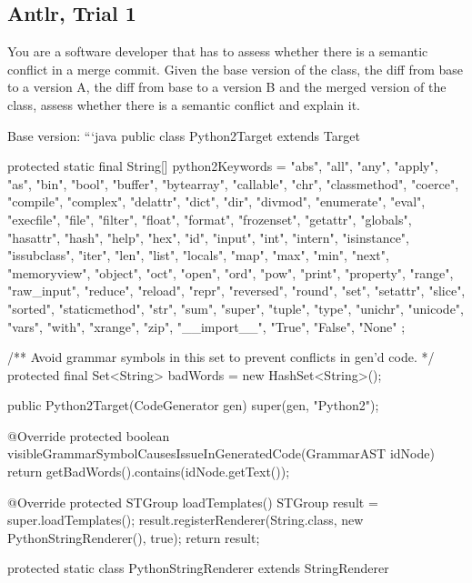 \subsection{Antlr, Trial 1}

\begin{prompt}
  You are a software developer that has to assess whether there is a semantic conflict in a merge commit.  Given the base version of the class, the diff from base to a version A, the diff from base to a version B and the merged version of the class, assess whether there is a semantic conflict and explain it.

  Base version:
  ```java
  public class Python2Target extends Target {
    protected static final String[] python2Keywords = {
      "abs", "all", "any", "apply", "as",
      "bin", "bool", "buffer", "bytearray",
      "callable", "chr", "classmethod", "coerce", "compile", "complex",
      "delattr", "dict", "dir", "divmod",
      "enumerate", "eval", "execfile",
      "file", "filter", "float", "format", "frozenset",
      "getattr", "globals",
      "hasattr", "hash", "help", "hex",
      "id", "input", "int", "intern", "isinstance", "issubclass", "iter",
      "len", "list", "locals",
      "map", "max", "min", "next",
      "memoryview",
      "object", "oct", "open", "ord",
      "pow", "print", "property",
      "range", "raw_input", "reduce", "reload", "repr", "reversed", "round",
      "set", "setattr", "slice", "sorted", "staticmethod", "str", "sum", "super",
      "tuple", "type",
      "unichr", "unicode",
      "vars",
      "with",
      "xrange",
      "zip",
      "__import__",
      "True", "False", "None"
    };
  
    /** Avoid grammar symbols in this set to prevent conflicts in gen'd code. */
    protected final Set<String> badWords = new HashSet<String>();
  
    public Python2Target(CodeGenerator gen) {
      super(gen, "Python2");
    }
  
    @Override
    protected boolean visibleGrammarSymbolCausesIssueInGeneratedCode(GrammarAST idNode) {
      return getBadWords().contains(idNode.getText());
    }
  
    @Override
    protected STGroup loadTemplates() {
      STGroup result = super.loadTemplates();
      result.registerRenderer(String.class, new PythonStringRenderer(), true);
      return result;
    }
  
    protected static class PythonStringRenderer extends StringRenderer {
  
}}
\end{prompt}
